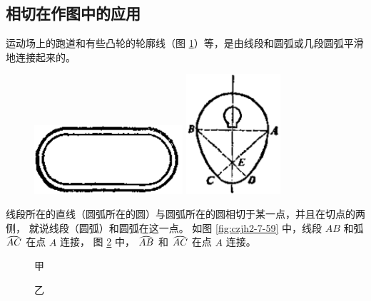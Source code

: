 \subsection{相切在作图中的应用}\label{subsec:czjh2-7-15}

运动场上的跑道和有些凸轮的轮廓线（图 \ref{fig:czjh2-7-58}）等，是由线段和圆弧或几段圆弧平滑地连接起来的。

\begin{figure}[htbp]
    \centering
    \begin{minipage}[b]{6cm}
        \centering
        \includegraphics[width=5.5cm]{../pic/czjh2-ch7-58-1.png}
    \end{minipage}
    \qquad
    \begin{minipage}[b]{4cm}
        \centering
        \includegraphics[width=3.5cm]{../pic/czjh2-ch7-58-2.png}
    \end{minipage}
    \caption{}\label{fig:czjh2-7-58}
\end{figure}

线段所在的直线（圆弧所在的圆）与圆弧所在的圆相切于某一点，并且在切点的两侧，
就说线段（圆弧）和圆弧在这一点。
如图 \ref{fig:czjh2-7-59} 中，线段 $AB$ 和弧 $\yuanhu{AC}$ 在点 $A$ 连接，
图 \ref{fig:czjh2-7-60} 中， $\yuanhu{AB}$ 和 $\yuanhu{AC}$ 在点 $A$ 连接。

\begin{figure}[htbp]
    \centering
    \begin{minipage}[b]{5cm}
        \centering
        
        \caption*{} %
        \caption{}\label{fig:czjh2-7-59}
    \end{minipage}
    \qquad
    \begin{minipage}[b]{10.5cm}
        \centering
        \begin{minipage}[b]{5.6cm}
            \centering
            
            \caption*{甲}
        \end{minipage}
        \begin{minipage}[b]{4cm}
            \centering
            
            \caption*{乙}
        \end{minipage}
        \caption{}\label{fig:czjh2-7-60}
    \end{minipage}
\end{figure}

